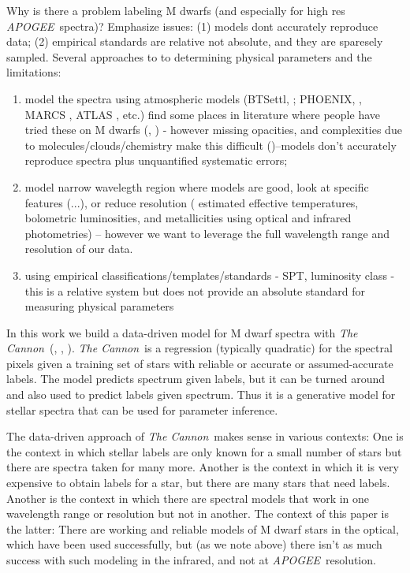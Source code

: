 \documentclass[modern]{aastex62}
\newcommand{\apogee}{\textsl{APOGEE}}
\newcommand{\thecannon}{\textsl{The Cannon}}
\begin{document}
Why is there a problem labeling M dwarfs (and especially for high res \apogee\ spectra)? Emphasize issues: (1) models dont accurately reproduce data; (2) empirical standards are relative not absolute, and they are sparesely sampled. Several approaches to to determining physical parameters and the limitations:

\begin{enumerate}
\item model the spectra using atmospheric models (BTSettl, \citealt{Allard:2011}; PHOENIX, \citealt{Husser:2013}, MARCS \citealt{Gustafsson:2008}, ATLAS \citealt{Castelli:2004}, etc.) find some places in literature where people have tried these on M dwarfs (\citealt{Rajpurohit:2014}, \citealt{Rajpurohit:2018}) - however missing opacities, and complexities due to molecules/clouds/chemistry make this difficult (\citealt{Allard:2013})--models don't accurately reproduce spectra plus unquantified systematic errors; 

\item model narrow wavelegth region where models are good, look at specific features (\citealt{Rojas-Ayala:2012}...), or reduce resolution (\citealt{Casagrande:2008} estimated effective temperatures, bolometric luminosities, and metallicities using optical and infrared photometries) -- however we want to leverage the full wavelength range and resolution of our data.

\item using empirical classifications/templates/standards - SPT, luminosity class - this is a relative system but does not provide an absolute standard for measuring physical parameters
\end{enumerate}

In this work we build a data-driven model for M dwarf spectra with \thecannon\ (\citealt{Ness:2015}, \citealt{Ho:2017a}, \citealt{Casey:2016}).
\thecannon\ is a regression (typically quadratic) for the spectral pixels given a training
set of stars with reliable or accurate or assumed-accurate labels.
The model predicts spectrum given labels, but it can be turned around and also
used to predict labels given spectrum.
Thus it is a generative model for stellar spectra that can be used for parameter inference.

The data-driven approach of \thecannon\ makes sense in various contexts:
One is the context in which stellar labels are only known for a small number of stars
but there are spectra taken for many more.
Another is the context in which it is very expensive to obtain labels for a star, but
there are many stars that need labels.
Another is the context in which there are spectral models that work in one wavelength
range or resolution but not in another.
The context of this paper is the latter:
There are working and reliable models of M dwarf stars in the optical, which have been
used successfully, but (as we note above) there isn't as much success with such modeling in the infrared,
and not at \apogee\ resolution.
\end{document}
